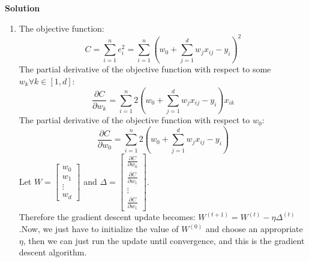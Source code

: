 \documentclass[twoside]{article}
\begin{document}
\textbf{Solution}
\begin{enumerate}
    \item 
    The objective function:
    \begin{equation*}
        C = \sum_{i=1}^n e_i^2 = \sum_{i=1}^n \left(w_0 + \sum_{j=1}^d w_j x_{ij} - y_i\right)^2
    \end{equation*}
    The partial derivative of the objective function with respect to some $w_k \forall k \in [1,d]$:
    \begin{equation*}
        \frac{\partial C}{\partial w_k} = \sum_{i=1}^n 2\left(w_0 + \sum_{j=1}^d w_j x_{ij} - y_i\right)x_{ik}
    \end{equation*}
    The partial derivative of the objective function with respect to $w_0$:
    \begin{equation*}
        \frac{\partial C}{\partial w_0} = \sum_{i=1}^n 2\left(w_0 + \sum_{j=1}^d w_j x_{ij} - y_i\right)
    \end{equation*}
    Let $W = \begin{bmatrix} w_0\\w_1\\ \vdots\\ w_d \end{bmatrix}$ and $\Delta = \begin{bmatrix} \frac{\partial C}{\partial w_0}\\\frac{\partial C}{\partial w_1}\\ \vdots\\ \frac{\partial C}{\partial w_1} \end{bmatrix}$.\\
    Therefore the gradient descent update becomes: $W^{(t+1)} = W^{(t)} - \eta \Delta ^ {(t)}$.Now, we just have to initialize the value of $W^{(0)}$ and choose an appropriate $\eta$, then we can just run the update until convergence, and this is the gradient descent algorithm.
    

\end{enumerate}
\end{document}
